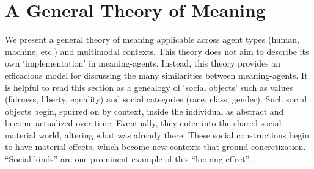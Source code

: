 \section{A General Theory of Meaning}\label{sec:theory}

We present a general theory of meaning applicable across agent types (human, machine, etc.) and multimodal contexts. 
This theory does not aim to describe its own `implementation' in meaning-agents. 
Instead, this theory provides an efficacious model for discussing the many similarities between meaning-agents.
It is helpful to read this section as a genealogy of `social objects' such as values (fairness, liberty, equality) and social categories (race, class, gender).
Such social objects begin, spurred on by context, inside the individual as abstract and become actualized over time.
Eventually, they enter into the shared social-material world, altering what was already there.
These social constructions begin to have material effects, which become new contexts that ground concretization.
``Social kinds'' are one prominent example of this ``looping effect'' \citep{Hacking:LoopingEffects}.



